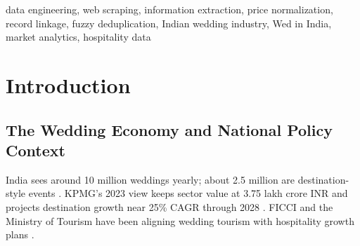 \documentclass[conference]{IEEEtran}
\begin{document}
\begin{abstract}
India's wedding economy is large, around 3.75 lakh crore INR or about USD 45 billion in KPMG's 2023 estimate \cite{b1}. On November 26, 2023, in Mann Ki Baat Episode 107, Prime Minister Modi pushed a simple line: stop exporting weddings, keep that spending inside India \cite{b9}. Soon after, ``Wed in India'' got formal push from government channels plus FICCI. Big policy push. Thin data.

The venue data exists, but in private silos. WedMeGood, VenueLook, ShaadiSaga, each with different field styles; pricing text shifts from per-plate to Lakh ranges to messy free text. Cross-platform comparison gets noisy quickly; sometimes impossible without normalization.

This paper presents WedVenueIQ, a five-phase data pipeline that scrapes, cleans, links duplicates, validates, then produces analytics. Rajasthan pilot: 5,942 raw records reduced to 2,036 unique clean venues. The expanded national output contains 13,211 venues across 10 states and 120 cities, with post-imputation price coverage of 99.9\%. We also propose three frameworks -- Wedding Venue Value Index, Cost-Popularity Z-score Classification, Micro-Location Composite Score -- and connect findings to the USD 5 billion NRI overseas wedding segment, recent Indian celebrity weddings, and international celebrity destination-wedding patterns.
\end{abstract}

\begin{IEEEkeywords}
data engineering, web scraping, information extraction, price normalization, record linkage, fuzzy deduplication, Indian wedding industry, Wed in India, market analytics, hospitality data
\end{IEEEkeywords}

\section{Introduction}

\subsection{The Wedding Economy and National Policy Context}

India sees around 10 million weddings yearly; about 2.5 million are destination-style events \cite{b1}. KPMG's 2023 view keeps sector value at 3.75 lakh crore INR and projects destination growth near 25\% CAGR through 2028 \cite{b1}. FICCI and the Ministry of Tourism have been aligning wedding tourism with hospitality growth plans \cite{b10}.
\end{document}
